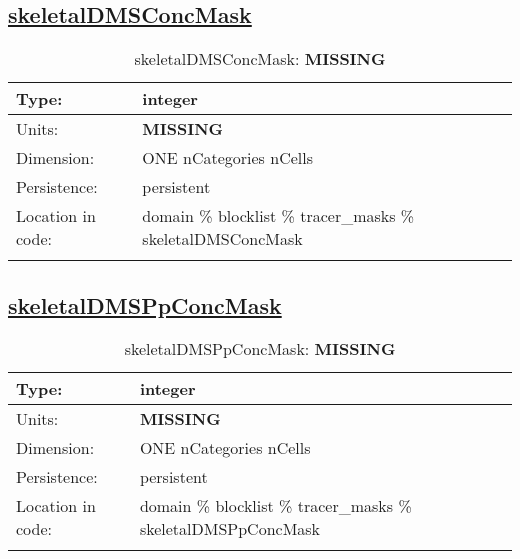 \subsection[skeletalDMSConcMask]{\hyperref[sec:var_tab_tracer_masks]{skeletalDMSConcMask}}
\label{subsec:var_sec_tracer_masks_skeletalDMSConcMask}
\begin{center}
\begin{longtable}{| p{2.0in} | p{4.0in} |}
        \hline 
        Type: & integer \\
        \hline 
        Units: & {\bf \color{red} MISSING} \\
        \hline 
        Dimension: & ONE nCategories nCells \\
        \hline 
        Persistence: & persistent \\
        \hline 
         Location in code: & domain \% blocklist \% tracer\_masks \% skeletalDMSConcMask \\
         \hline 
    \caption{skeletalDMSConcMask: {\bf \color{red} MISSING}}
\end{longtable}
\end{center}
\subsection[skeletalDMSPpConcMask]{\hyperref[sec:var_tab_tracer_masks]{skeletalDMSPpConcMask}}
\label{subsec:var_sec_tracer_masks_skeletalDMSPpConcMask}
\begin{center}
\begin{longtable}{| p{2.0in} | p{4.0in} |}
        \hline 
        Type: & integer \\
        \hline 
        Units: & {\bf \color{red} MISSING} \\
        \hline 
        Dimension: & ONE nCategories nCells \\
        \hline 
        Persistence: & persistent \\
        \hline 
         Location in code: & domain \% blocklist \% tracer\_masks \% skeletalDMSPpConcMask \\
         \hline 
    \caption{skeletalDMSPpConcMask: {\bf \color{red} MISSING}}
\end{longtable}
\end{center}
